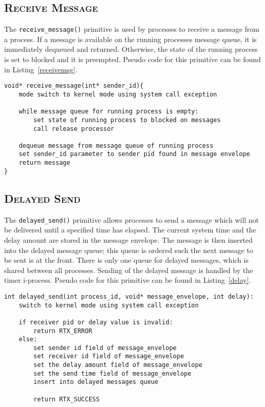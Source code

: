 \documentclass[oneside]{report}
\begin{document}
\subsection{\textsc{Receive Message}}

The \texttt{receive\_message()} primitive is used by processes to
receive a message from a process. If a message is available on the
running processes message queue, it is immediately dequeued and
returned. Otherwise, the state of the running process is set to
blocked and it is preempted. Pseudo code for this primitive can be
found in Listing~\ref{receivemsg}.

\begin{lstlisting}
void* receive_message(int* sender_id){
    mode switch to kernel mode using system call exception

    while message queue for running process is empty:
        set state of running process to blocked on messages
        call release processor

    dequeue message from message queue of running process
    set sender_id parameter to sender pid found in message envelope
    return message
}
\end{lstlisting}

\subsection{\textsc{Delayed Send}}

The \texttt{delayed\_send()} primitive allows processes to send a
message which will not be delivered until a specified time has
elapsed. The current system time and the delay amount are stored in
the message envelope. The message is then inserted into the delayed
message queue; this queue is ordered such the next message to be sent is at
the front. There is only one queue for delayed messages, which is shared
between all processes. Sending of the delayed message is handled by
the timer i-process. Pseudo code for this primitive can be found in
Listing~\ref{delay}.

\begin{lstlisting}
int delayed_send(int process_id, void* message_envelope, int delay):
    switch to kernel mode using system call exception

    if receiver pid or delay value is invalid:
        return RTX_ERROR
    else:
        set sender id field of message_envelope
        set receiver id field of message_envelope
        set the delay amount field of message_envelope
        set the send time field of message_envelope
        insert into delayed messages queue

        return RTX_SUCCESS
\end{lstlisting}
\end{document}
